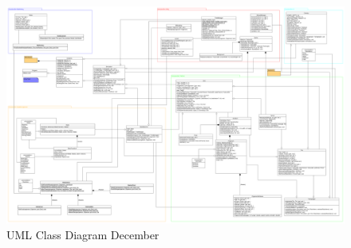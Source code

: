 \documentclass[a4paper, oneside, 11pt]{report}
\begin{document}
{\begin{landscape}
	\begin{figure}[H]
		\caption{UML Class Diagram December}\label{classdiagram-2}
		\includegraphics[height=\textheight]{class-diagram-2}
	\end{figure}
\end{landscape}

}
\end{document}

